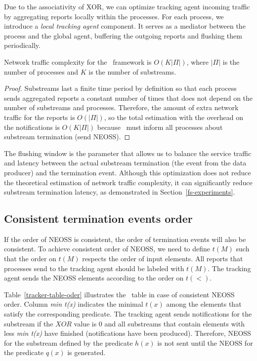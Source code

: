 Due to the associativity of XOR, we can optimize tracking agent incoming traffic by aggregating reports locally within the processes. For each process, we introduce a {\em local tracking agent} component. It serves as a mediator between the process and the global agent, buffering the outgoing reports and flushing them periodically. 

\begin{lemma}
Network traffic complexity for the \tracker\ framework is $O(K|\Pi|)$, where $|\Pi|$ is the number of processes and $K$ is the number of substreams.
\end{lemma}
\begin{proof}
Substreams last a finite time period by definition so that each process sends aggregated reports a constant number of times that does not depend on the number of substreams and processes. Therefore, the amount of extra network traffic for the reports is $O(|\Pi|)$, so the total estimation with the overhead on the notifications is $O(K|\Pi|)$ because \tracker\ must inform all processes about substream termination (send NEOSS).
\end{proof}

The flushing window is the parameter that allows us to balance the service traffic and latency between the actual substream termination (the event from the data producer) and the termination event. Although this optimization does not reduce the theoretical estimation of network traffic complexity, it can significantly reduce substream termination latency, as demonstrated in Section~\ref{fs-experiments}.

\subsection{Consistent termination events order}
\label{termination_order_impl}

If the order of NEOSS is consistent, the order of termination events will also be consistent. To achieve consistent order of NEOSS, we need to define $t(M)$ such that the order on $t(M)$ respects the order of input elements. All reports that processes send to the tracking agent should be labeled with $t(M)$. The tracking agent sends the NEOSS elements according to the order on $t(<)$.

Table~\ref{tracker-table-oder} illustrates the \tracker\ table in case of consistent NEOSS order. Column {\em min t(x)} indicates the minimal $t(x)$ among the elements that satisfy the corresponding predicate. The tracking agent sends notifications for the substream if the $XOR$ value is 0 and all substreams that contain elements with less {\em min t(x)} have finished (notifications have been produced). Therefore, NEOSS for the substream defined by the predicate $h(x)$ is not sent until the NEOSS for the predicate $q(x)$ is generated. 

